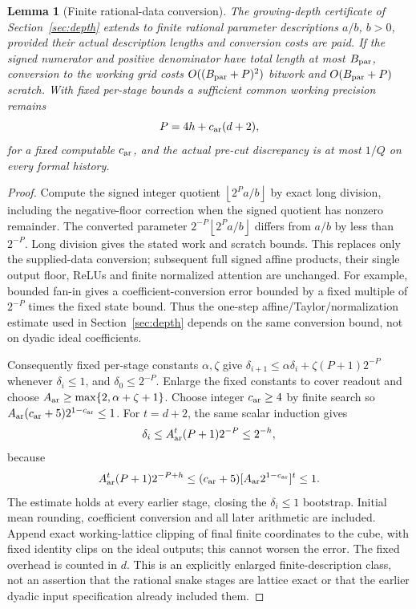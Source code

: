 \documentclass[11pt,letterpaper]{article}
\newtheorem{lemma}[theorem]{Lemma}
\theoremstyle{definition}\newtheorem{definition}[theorem]{Definition}
\theoremstyle{remark}\newtheorem{remark}[theorem]{Remark}
\newcommand{\floor}[1]{\left\lfloor #1\right\rfloor}
\begin{document}
\begin{lemma}[Finite rational-data conversion]\label{lem:rationalconversion}
The growing-depth certificate of Section~\ref{sec:depth} extends to finite rational parameter descriptions $a/b$, $b>0$, provided their actual description lengths and conversion costs are paid. If the signed numerator and positive denominator have total length at most $B_{\rm par}$, conversion to the working grid costs $O((B_{\rm par}+P)^2)$ bitwork and $O(B_{\rm par}+P)$ scratch. With fixed per-stage bounds a sufficient common working precision remains
\begin{equation}\label{eq:rationalprecision}
 P=4h+c_{\rm ar}(d+2),
\end{equation}
for a fixed computable $c_{\rm ar}$, and the actual pre-cut discrepancy is at most $1/Q$ on every formal history.
\end{lemma}
\begin{proof}
Compute the signed integer quotient $\floor{2^Pa/b}$ by exact long division, including the negative-floor correction when the signed quotient has nonzero remainder. The converted parameter $2^{-P}\floor{2^Pa/b}$ differs from $a/b$ by less than $2^{-P}$. Long division gives the stated work and scratch bounds. This replaces only the supplied-data conversion; subsequent full signed affine products, their single output floor, ReLUs and finite normalized attention are unchanged. For example, bounded fan-in gives a coefficient-conversion error bounded by a fixed multiple of $2^{-P}$ times the fixed state bound. Thus the one-step affine/Taylor/normalization estimate used in Section~\ref{sec:depth} depends on the same conversion bound, not on dyadic ideal coefficients.

Consequently fixed per-stage constants $\alpha,\zeta$ give
$\delta_{i+1}\le\alpha\delta_i+\zeta(P+1)2^{-P}$ whenever $\delta_i\le1$, and $\delta_0\le2^{-P}$. Enlarge the fixed constants to cover readout and choose $A_{\rm ar}\ge\max\{2,\alpha+\zeta+1\}$. Choose integer $c_{\rm ar}\ge4$ by finite search so
$A_{\rm ar}(c_{\rm ar}+5)2^{1-c_{\rm ar}}\le1$.
For $t=d+2$, the same scalar induction gives
\[
 \delta_i\le A_{\rm ar}^{t}(P+1)2^{-P}\le2^{-h},
\]
because
\[
 A_{\rm ar}^{t}(P+1)2^{-P+h}
 \le(c_{\rm ar}+5)[A_{\rm ar}2^{1-c_{\rm ar}}]^t\le1.
\]
The estimate holds at every earlier stage, closing the $\delta_i\le1$ bootstrap. Initial mean rounding, coefficient conversion and all later arithmetic are included. Append exact working-lattice clipping of final finite coordinates to the cube, with fixed identity clips on the ideal outputs; this cannot worsen the error. The fixed overhead is counted in $d$. This is an explicitly enlarged finite-description class, not an assertion that the rational snake stages are lattice exact or that the earlier dyadic input specification already included them.
\end{proof}
\end{document}
